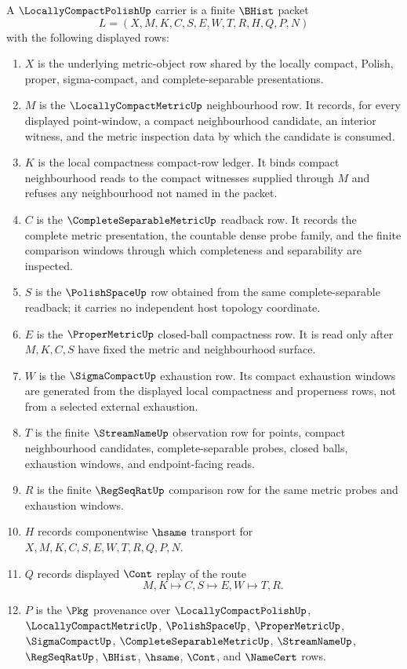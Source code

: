 \begin{definition}
\label{def:locally-compact-polish-carrier}
A $\LocallyCompactPolishUp$ carrier is a finite $\BHist$ packet
$$
L=(X,M,K,C,S,E,W,T,R,H,Q,P,N)
$$
with the following displayed rows:
\begin{enumerate}
\item $X$ is the underlying metric-object row shared by the locally compact, Polish, proper, sigma-compact, and complete-separable presentations.
\item $M$ is the $\LocallyCompactMetricUp$ neighbourhood row. It records, for every displayed point-window, a compact neighbourhood candidate, an interior witness, and the metric inspection data by which the candidate is consumed.
\item $K$ is the local compactness compact-row ledger. It binds compact neighbourhood reads to the compact witnesses supplied through $M$ and refuses any neighbourhood not named in the packet.
\item $C$ is the $\CompleteSeparableMetricUp$ readback row. It records the complete metric presentation, the countable dense probe family, and the finite comparison windows through which completeness and separability are inspected.
\item $S$ is the $\PolishSpaceUp$ row obtained from the same complete-separable readback; it carries no independent host topology coordinate.
\item $E$ is the $\ProperMetricUp$ closed-ball compactness row. It is read only after $M,K,C,S$ have fixed the metric and neighbourhood surface.
\item $W$ is the $\SigmaCompactUp$ exhaustion row. Its compact exhaustion windows are generated from the displayed local compactness and properness rows, not from a selected external exhaustion.
\item $T$ is the finite $\StreamNameUp$ observation row for points, compact neighbourhood candidates, complete-separable probes, closed balls, exhaustion windows, and endpoint-facing reads.
\item $R$ is the finite $\RegSeqRatUp$ comparison row for the same metric probes and exhaustion windows.
\item $H$ records componentwise $\hsame$ transport for $X,M,K,C,S,E,W,T,R,Q,P,N$.
\item $Q$ records displayed $\Cont$ replay of the route
$$
M,K \longmapsto C,S \longmapsto E,W \longmapsto T,R .
$$
\item $P$ is the $\Pkg$ provenance over $\LocallyCompactPolishUp$, $\LocallyCompactMetricUp$, $\PolishSpaceUp$, $\ProperMetricUp$, $\SigmaCompactUp$, $\CompleteSeparableMetricUp$, $\StreamNameUp$, $\RegSeqRatUp$, $\BHist$, $\hsame$, $\Cont$, and $\NameCert$ rows.

\end{enumerate}
\end{definition}
